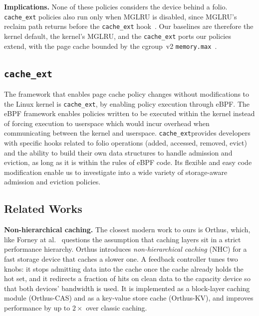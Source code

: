 \documentclass[11pt,sigconf,nonacm]{acmart}
\newcommand{\cacheExt}{\texttt{cache\_ext}}
\begin{document}

\textbf{Implications.} None of these policies considers the device behind a folio. \cacheExt{} policies also run only when MGLRU is disabled, since MGLRU's reclaim path returns before the \cacheExt{} hook~\cite{linuxv66src}. Our baselines are therefore the kernel default, the kernel's MGLRU, and the \cacheExt{} ports our policies extend, with the page cache bounded by the cgroup~v2 \texttt{memory.max}~\cite{cgroupv2}.

\subsection{\cacheExt}

The framework that enables page cache policy changes without modifications to the Linux kernel is \cacheExt, by enabling policy execution through eBPF. The eBPF framework enables policies written to be executed within the kernel instead of forcing execution to userspace which would incur overhead when communicating between the kernel and userspace. \cacheExt provides developers with specific hooks related to folio operations (added, accessed, removed, evict) and the ability to build their own data structures to handle admission and eviction, as long as it is within the rules of eBPF code. Its flexible and easy code modification enable us to investigate into a wide variety of storage-aware admission and eviction policies.

\subsection{Related Works}



\textbf{Non-hierarchical caching.} The closest modern work to ours is Orthus\cite{orthus}, which, like Forney at al.\ \cite{forney} questions the assumption that caching layers sit in a strict performance hierarchy. Orthus introduces \textit{non-hierarchical caching} (NHC) for a fast storage device that caches a slower one. A feedback controller tunes two knobs: it stops admitting data into the cache once the cache already holds the hot set, and it redirects a fraction of hits on clean data to the capacity device so that both devices' bandwidth is used. It is implemented as a block-layer caching module (Orthus-CAS) and as a key-value store cache (Orthus-KV), and improves performance by up to $2\times$ over classic caching.
\end{document}
